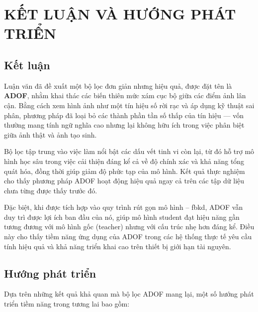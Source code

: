 \chapter{KẾT LUẬN VÀ HƯỚNG PHÁT TRIỂN}

\section{Kết luận}
Luận văn đã đề xuất một bộ lọc đơn giản nhưng hiệu quả, được đặt tên là \textbf{ADOF}, nhằm khai thác các biến thiên mức xám cục bộ giữa các điểm ảnh lân cận. Bằng cách xem hình ảnh như một tín hiệu số rời rạc và áp dụng kỹ thuật sai phân, phương pháp đã loại bỏ các thành phần tần số thấp của tín hiệu — vốn thường mang tính ngữ nghĩa cao nhưng lại không hữu ích trong việc phân biệt giữa ảnh thật và ảnh tạo sinh.

Bộ lọc tập trung vào việc làm nổi bật các dấu vết tinh vi còn lại, từ đó hỗ trợ mô hình học sâu trong việc cải thiện đáng kể cả về độ chính xác và khả năng tổng quát hóa, đồng thời giúp giảm độ phức tạp của mô hình. Kết quả thực nghiệm cho thấy phương pháp ADOF hoạt động hiệu quả ngay cả trên các tập dữ liệu chưa từng được thấy trước đó.

Đặc biệt, khi được tích hợp vào quy trình rút gọn mô hình -- \gls{fbkd}, ADOF vẫn duy trì được lợi ích ban đầu của nó, giúp mô hình \gls{student} đạt hiệu năng gần tương đương với mô hình gốc (\gls{teacher}) nhưng với cấu trúc nhẹ hơn đáng kể. Điều này cho thấy tiềm năng ứng dụng của ADOF trong các hệ thống thực tế yêu cầu tính hiệu quả và khả năng triển khai cao trên thiết bị giới hạn tài nguyên.

\section{Hướng phát triển}
Dựa trên những kết quả khả quan mà bộ lọc ADOF mang lại, một số hướng phát triển tiềm năng trong tương lai bao gồm:


